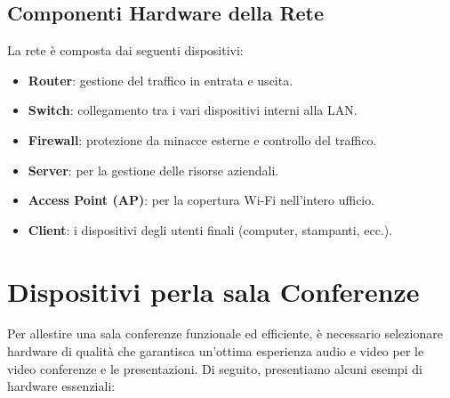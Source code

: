 \documentclass{assignment}
\begin{document}
\subsection{Componenti Hardware della Rete}
La rete è composta dai seguenti dispositivi:

\begin{itemize}
    \item \textbf{Router}: gestione del traffico in entrata e uscita.
    \item \textbf{Switch}: collegamento tra i vari dispositivi interni alla LAN.
    \item \textbf{Firewall}: protezione da minacce esterne e controllo del traffico.
    \item \textbf{Server}: per la gestione delle risorse aziendali.
    \item \textbf{Access Point (AP)}: per la copertura Wi-Fi nell'intero ufficio.
    \item \textbf{Client}: i dispositivi degli utenti finali (computer, stampanti, ecc.).
\end{itemize}


\section{Dispositivi perla sala Conferenze}

Per allestire una sala conferenze funzionale ed efficiente, è necessario selezionare hardware di qualità che garantisca un'ottima esperienza audio e video per le video conferenze e le presentazioni. Di seguito, presentiamo alcuni esempi di hardware essenziali:
\end{document}
